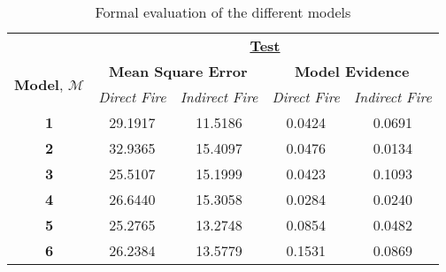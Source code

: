 \documentclass[a4paper,11pt]{report}
\begin{document}
\begin{table}[]
\centering
\caption{Formal evaluation of the different models}
\label{model-comparison}
\begin{tabular}{ccccc}
\multicolumn{1}{l}{}                                       & \multicolumn{4}{c}{{\ul \textbf{Test}}}                                                                                                                                           \\
\multicolumn{1}{c|}{\multirow{2}{*}{{ \textbf{Model}}, \(\mathcal{M}\)}} & \multicolumn{2}{c|}{\textbf{Mean Square Error}}                                         & \multicolumn{2}{c}{\textbf{Model Evidence}}                                                         \\
\multicolumn{1}{c|}{}                                      & \multicolumn{1}{c|}{\textit{Direct Fire}} & \multicolumn{1}{c|}{\textit{Indirect Fire}} & \multicolumn{1}{c|}{\textit{Direct Fire}} & \multicolumn{1}{c}{\textit{Indirect Fire}} \\ \hline
\multicolumn{1}{c|}{\textbf{1}}                    & \multicolumn{1}{c|}{29.1917}              & \multicolumn{1}{c|}{11.5186}                & \multicolumn{1}{c|}{0.0424}               & \multicolumn{1}{c}{0.0691}                 \\ \hline
\multicolumn{1}{c|}{\textbf{2}}            & \multicolumn{1}{c|}{32.9365}              & \multicolumn{1}{c|}{15.4097}                & \multicolumn{1}{c|}{0.0476}               & \multicolumn{1}{c}{0.0134}                 \\ \hline
\multicolumn{1}{c|}{\textbf{3}}    & \multicolumn{1}{c|}{25.5107}              & \multicolumn{1}{c|}{15.1999}                & \multicolumn{1}{c|}{0.0423}               & \multicolumn{1}{c}{0.1093}                 \\ \hline
\multicolumn{1}{c|}{\textbf{4}}            & \multicolumn{1}{c|}{26.6440}              & \multicolumn{1}{c|}{15.3058}                & \multicolumn{1}{c|}{0.0284}               & \multicolumn{1}{c}{0.0240}                 \\ \hline
\multicolumn{1}{c|}{\textbf{5}}    & \multicolumn{1}{c|}{25.2765}              & \multicolumn{1}{c|}{13.2748}                & \multicolumn{1}{c|}{0.0854}               & \multicolumn{1}{c}{0.0482}                 \\ \hline
\multicolumn{1}{c|}{\textbf{6}}    & \multicolumn{1}{c|}{26.2384}              & \multicolumn{1}{c|}{13.5779}                & \multicolumn{1}{c|}{0.1531}               & \multicolumn{1}{c}{0.0869}                 \\ \hline
\end{tabular}
\end{table}
\end{document}

